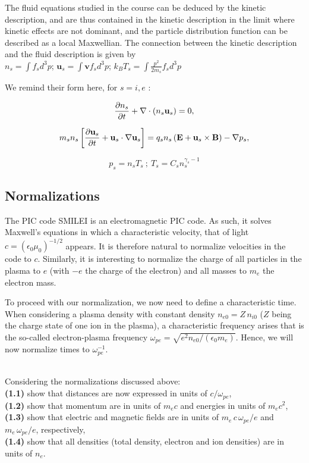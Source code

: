 \documentclass[11pt,a4paper]{article}
\newcommand{\vE}{\mathbf{E}}
\newcommand{\vB}{\mathbf{B}}
\newcommand{\vv}{\mathbf{v}}
\newcommand{\vu}{\mathbf{u}}
\begin{document}
The fluid equations studied in the course can be deduced by the kinetic description, and are thus contained in the kinetic description 
in the limit where kinetic effects are not dominant, and the particle distribution function can be described as a local Maxwellian. 
The connection between the kinetic description and the fluid description is given by \\$n_s= \int f_s d^3p$; $\vu_s =
\int \vv f_s d^3p$; $k_B T_s =\int \frac{p^2}{2m_s}  f_s d^3p$

We remind their form here, for  $s=i,e$ :

\begin{equation}
\frac{\partial  n_s}{\partial t}+
 {\bf{\nabla}} \cdot (n_s \vu_s) =  0,
\end{equation}

\begin{equation}
m_s n_s \left[\frac{\partial \vu_s}{\partial t}+\vu_s \cdot {\bf{\nabla}} \vu_s
\right] = q_s n_s \left( \vE + \vu_s \times \vB \right) - {\bf{\nabla}} p_s ,  
\end{equation}


\begin{equation}
p_s = n_s T_s ~;~  
T_s = C_s n_s^{\gamma_s-1}
\end{equation}

\subsection*{Normalizations}

The PIC code SMILEI is an electromagnetic PIC code. As such, it solves Maxwell's equations in which a characteristic velocity, that of light $c = (\epsilon_0 \mu_0)^{-1/2}$ appears. It is therefore natural to normalize velocities in the code to $c$. Similarly, it is interesting to normalize the charge of all particles in the plasma to $e$ (with $-e$ the charge of the electron) and all masses to $m_e$ the electron mass.

To proceed with our normalization, we now need to define a characteristic time. When considering a plasma density with constant density $n_{e0} = Z\,n_{i0}$ ($Z$ being the charge state of one ion in the plasma), a characteristic frequency arises that is the so-called electron-plasma frequency $\omega_{pe} = \sqrt{e^2 n_{e0}/(\epsilon_0 m_e)}$. Hence, we will now normalize times to $\omega_{pe}^{-1}$.

\\
Considering the normalizations discussed above: \\
{\bf (1.1)} show that distances are now expressed in units of $c/\omega_{pe}$,\\
{\bf (1.2)} show that momentum are in units of $m_e c$ and energies in units of $m_e c^2$,\\
{\bf (1.3)} show that electric and magnetic fields are in units of $m_e\,c\,\omega_{pe}/e$ and $m_e\,\omega_{pe}/e$, respectively,\\
{\bf (1.4)} show that all densities (total density, electron and ion densities) are in units of $n_e$.
\end{document}
